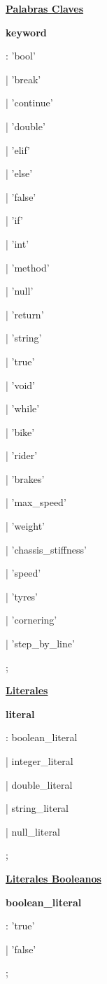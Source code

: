 \documentclass[12pt, letterpaper,spanish]{article}
\theoremstyle{definition}
\theoremstyle{remark}
\begin{document}
	\underline{\textbf{Palabras Claves}}\par
	\textbf{keyword}\par             
	: 'bool'\par
	| 'break'\par
	| 'continue'\par 
	| 'double'\par
	| 'elif'\par
	| 'else'\par
	| 'false'\par
	| 'if'\par
	| 'int'\par
	| 'method'\par
	| 'null'\par
	| 'return'\par
	| 'string'\par
	| 'true'\par
	| 'void'\par
	| 'while'\par
	
	| 'bike'\par
	| 'rider'\par
	
	| 'brakes'\par
	| 'max\_speed'\par
	| 'weight'\par
	| 'chassis\_stiffness'\par
	| 'speed'\par
	| 'tyres'\par
	| 'cornering'\par
	| 'step\_by\_line'\par		
	;\par
	
	\underline{\textbf{Literales}}\par
	\textbf{literal}\par
	: boolean\_literal\par
	| integer\_literal\par
	| double\_literal\par
	| string\_literal\par
	| null\_literal\par
	;\par
	
	\underline{\textbf{Literales Booleanos}}\par
	\textbf{boolean\_literal}\par
	: 'true'\par
	| 'false'\par
	;\par
	
\end{document}
